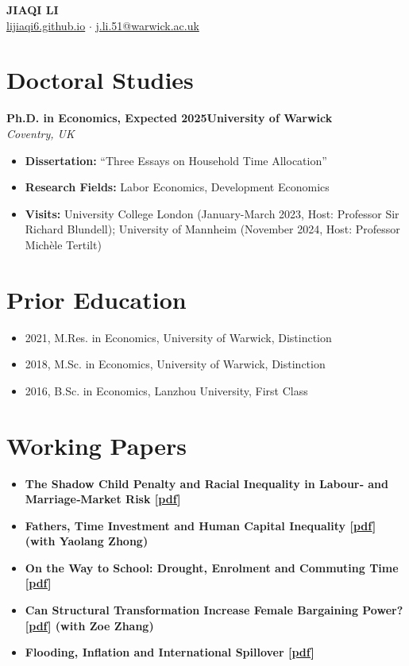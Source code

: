 \documentclass[11pt,a4paper]{article}
\newcommand{\cventry}[4]{
    \noindent\textbf{#1}\hfill\textbf{#2} \\
    \textit{#3}\hfill\textit{#4}
    \vspace{0.2em}
}
\newcommand{\cvitem}[2]{
    \item \textbf{#1} \\ #2
}
\begin{document}
\begin{center}
    {\Huge\bfseries JIAQI LI} \\
    \vspace{0.3em}
    \href{https://lijiaqi6.github.io/}{lijiaqi6.github.io} $\cdot$ \href{mailto:j.li.51@warwick.ac.uk}{j.li.51@warwick.ac.uk}
\end{center}
\vspace{1em}

\section{Doctoral Studies}
\cventry{Ph.D. in Economics, Expected 2025}{University of Warwick}{\textup{Coventry, UK}}{}
\vspace{-0.5em}
\begin{itemize}[leftmargin=*, itemsep=0.2em]
    \item[] \textbf{Dissertation:} ``Three Essays on Household Time Allocation''
    \item[] \textbf{Research Fields:} Labor Economics, Development Economics
    \item[] \textbf{Visits:} University College London (January-March 2023, Host: Professor Sir Richard Blundell); University of Mannheim (November 2024, Host: Professor Michèle Tertilt)
\end{itemize}

\section{Prior Education}
\begin{itemize}[leftmargin=*, itemsep=0.2em]
    \item 2021, M.Res. in Economics, University of Warwick, Distinction
    \item 2018, M.Sc. in Economics, University of Warwick, Distinction
    \item 2016, B.Sc. in Economics, Lanzhou University, First Class
\end{itemize}

\section{Working Papers}
\begin{itemize}[leftmargin=*, itemsep=0.3em]
    \cvitem{The Shadow Child Penalty and Racial Inequality in Labour‑ and Marriage‑Market Risk [\href{https://lijiaqi6.github.io/li_race.pdf}{pdf}]}{}
    \cvitem{Fathers, Time Investment and Human Capital Inequality [\href{https://lijiaqi6.github.io/Father.pdf}{pdf}] (with Yaolang Zhong)}{}
    \cvitem{On the Way to School: Drought, Enrolment and Commuting Time [\href{https://lijiaqi6.github.io/Drought.pdf}{pdf}]}{}
    \cvitem{Can Structural Transformation Increase Female Bargaining Power? [\href{https://papers.ssrn.com/sol3/papers.cfm?abstract_id=4955252}{pdf}] (with Zoe Zhang)}{}
    \cvitem{Flooding, Inflation and International Spillover [\href{https://papers.ssrn.com/sol3/papers.cfm?abstract_id=4816569}{pdf}]}{}
\end{itemize}
\end{document}

